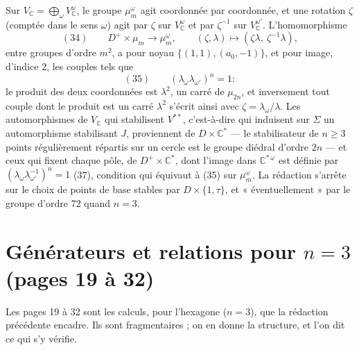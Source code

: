 \documentclass[11pt,a4paper]{article}
\begin{document}
Sur $V_{\mathbb{C}} = \bigoplus_\omega V_{\mathbb{C}}^{\omega}$, le groupe
$\mu_m^{\underline{\omega}}$ agit coordonnée par coordonnée, et une rotation
$\zeta$ (comptée dans le sens $\omega$) agit par $\zeta$ sur
$V_{\mathbb{C}}^{\omega}$ et par $\zeta^{-1}$ sur $V_{\mathbb{C}}^{\omega'}$.
L'homomorphisme
\[
(34)\qquad D^{+} \times \mu_m \longrightarrow \mu_m^{\underline{\omega}},
\qquad (\zeta, \lambda) \longmapsto (\zeta\lambda,\ \zeta^{-1}\lambda),
\]
entre groupes d'ordre $m^2$, a pour noyau $\{(1,1), (a_0, -1)\}$, et pour
image, d'indice $2$, les couples tels que
\[
(35)\qquad (\lambda_\omega \lambda_{\omega'})^{n} = 1 :
\]
le produit des deux coordonnées est $\lambda^2$, un carré de $\mu_{2n}$, et
inversement tout couple dont le produit est un carré $\lambda^2$ s'écrit ainsi
avec $\zeta = \lambda_\omega/\lambda$. Les automorphismes de $V_{\mathbb{C}}$
qui stabilisent $V^{**}$, c'est-à-dire qui induisent sur $\Sigma$ un
automorphisme stabilisant $J$, proviennent de $D \times \mathbb{C}^{*}$ — le
stabilisateur de $n \geq 3$ points régulièrement répartis sur un cercle est le
groupe diédral d'ordre $2n$ — et ceux qui fixent chaque pôle, de $D^{+} \times
\mathbb{C}^{*}$, dont l'image dans $\mathbb{C}^{*\,\underline{\omega}}$ est
définie par $(\lambda_\omega \lambda_{\omega'}^{-1})^{n} = 1$ (37), condition
qui équivaut à (35) sur $\mu_m^{\underline{\omega}}$. La rédaction s'arrête
sur le choix de points de base stables par $D \times \{1, \tau\}$, et
« éventuellement » par le groupe d'ordre $72$ quand $n = 3$.

\section*{Générateurs et relations pour $n = 3$ (pages 19 à 32)}

Les pages 19 à 32 sont les calculs, pour l'hexagone ($n = 3$), que la
rédaction précédente encadre. Ils sont fragmentaires ; on en donne la
structure, et l'on dit ce qui s'y vérifie.
\end{document}

